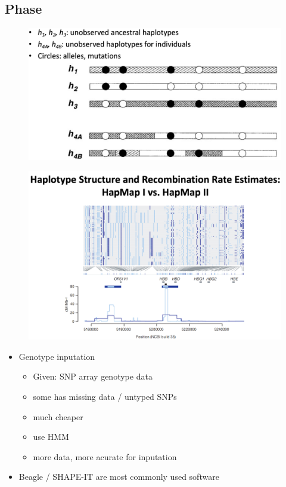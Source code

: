\documentclass[font=12pt]{article}
\begin{document}
\subsection{Phase}
\begin{figure}[h!]
	\centering
	\includegraphics[width=0.7\linewidth]{phase}
	\label{fig:phase}
\end{figure}

\begin{figure}[h!]
	\centering
	\includegraphics[width=0.7\linewidth]{"haplotype structure"}
	\label{fig:haplotype-structure}
\end{figure}
\begin{itemize}
	\item Genotype inputation
	\begin{itemize}
		\item Given: SNP array genotype data
		\item some has missing data / untyped SNPs
		\item much cheaper
		\item use HMM
		\item more data, more acurate for inputation
	\end{itemize}
	\item Beagle / SHAPE-IT are most commonly used software
\end{itemize}
\end{document}
